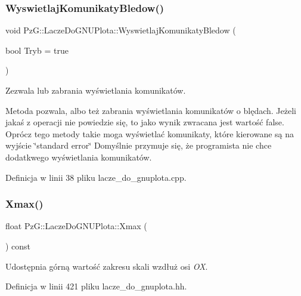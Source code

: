 \subsubsection{\texorpdfstring{Wyswietlaj\+Komunikaty\+Bledow()}{WyswietlajKomunikatyBledow()}}
{\footnotesize\ttfamily void Pz\+G\+::\+Lacze\+Do\+G\+N\+U\+Plota\+::\+Wyswietlaj\+Komunikaty\+Bledow (\begin{DoxyParamCaption}\item[{bool}]{Tryb = {\ttfamily true} }\end{DoxyParamCaption})}



Zezwala lub zabrania wyświetlania komunikatów. 

Metoda pozwala, albo też zabrania wyświetlania komunikatów o blędach. Jeżeli jakaś z operacji nie powiedzie się, to jako wynik zwracana jest wartość {\ttfamily false}. Oprócz tego metody takie moga wyświetlać komunikaty, które kierowane są na wyjście \char`\"{}standard error\char`\"{} Domyślnie przymuje się, że programista nie chce dodatkwego wyświetlania komunikatów. 

Definicja w linii 38 pliku lacze\+\_\+do\+\_\+gnuplota.\+cpp.

\mbox{\label{class_pz_g_1_1_lacze_do_g_n_u_plota_a8e23479629af3df3d352b7839ae396b8}} 
\subsubsection{\texorpdfstring{Xmax()}{Xmax()}}
{\footnotesize\ttfamily float Pz\+G\+::\+Lacze\+Do\+G\+N\+U\+Plota\+::\+Xmax (\begin{DoxyParamCaption}{ }\end{DoxyParamCaption}) const\hspace{0.3cm}{\ttfamily [inline]}}

Udostępnia górną wartość zakresu skali wzdłuż osi {\itshape OX}. 

Definicja w linii 421 pliku lacze\+\_\+do\+\_\+gnuplota.\+hh.

\mbox{\label{class_pz_g_1_1_lacze_do_g_n_u_plota_a66836c9749bf179420e4ca3e9447efd7}} 
